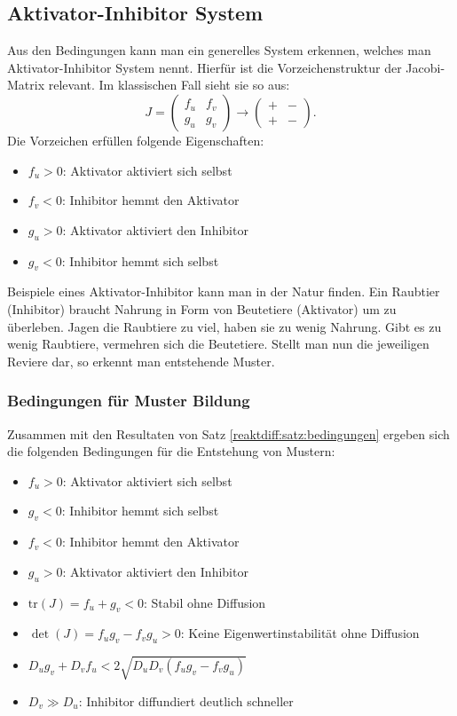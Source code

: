 \subsection{Aktivator-Inhibitor System}
Aus den Bedingungen kann man ein generelles System erkennen, welches man Aktivator-Inhibitor System nennt.
Hierfür ist die Vorzeichenstruktur der Jacobi-Matrix relevant.
Im klassischen Fall sieht sie so aus:
\begin{equation*}
        J =
    \begin{pmatrix}
        f_u & f_v\\
        g_u & g_v
    \end{pmatrix} 
    \rightarrow
    \begin{pmatrix}
        + & -\\
        + & -
    \end{pmatrix}.
\end{equation*}
Die Vorzeichen erfüllen folgende Eigenschaften:
\begin{itemize}
    \item \(f_u > 0\): Aktivator aktiviert sich selbst
    \item \(f_v < 0\): Inhibitor hemmt den Aktivator
    \item \(g_u > 0\): Aktivator aktiviert den Inhibitor
    \item \(g_v < 0\): Inhibitor hemmt sich selbst
\end{itemize}
Beispiele eines Aktivator-Inhibitor kann man in der Natur finden.
Ein Raubtier (Inhibitor) braucht Nahrung in Form von Beutetiere (Aktivator) um zu überleben.
Jagen die Raubtiere zu viel, haben sie zu wenig Nahrung.
Gibt es zu wenig Raubtiere, vermehren sich die Beutetiere.
Stellt man nun die jeweiligen Reviere dar, so erkennt man entstehende Muster.

\subsubsection{Bedingungen für Muster Bildung}
Zusammen mit den Resultaten von Satz \ref{reaktdiff:satz:bedingungen} ergeben sich die folgenden Bedingungen für die Entstehung von Mustern:
        \begin{itemize}
            \item \(f_u > 0\): Aktivator aktiviert sich selbst
            \item \(g_v < 0\): Inhibitor hemmt sich selbst
            \item \(f_v < 0\): Inhibitor hemmt den Aktivator
            \item \(g_u > 0\): Aktivator aktiviert den Inhibitor
            \item \(\text{tr}(J) = f_u + g_v < 0\): Stabil ohne Diffusion
            \item \(\det(J) = f_u g_v - f_v g_u > 0\): Keine Eigenwertinstabilität ohne Diffusion
            \item \(D_u g_v + D_v f_u < 2\sqrt{D_u D_v (f_u g_v - f_v g_u)}\)
            \item \(D_v \gg D_u\): Inhibitor diffundiert deutlich schneller
        \end{itemize}

